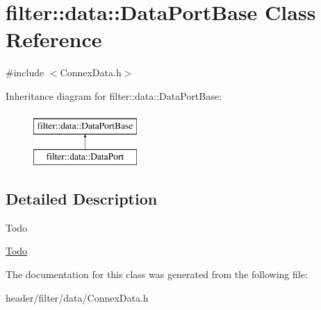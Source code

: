 \hypertarget{classfilter_1_1data_1_1_data_port_base}{}\section{filter\+:\+:data\+:\+:Data\+Port\+Base Class Reference}
\label{classfilter_1_1data_1_1_data_port_base}


{\ttfamily \#include $<$Connex\+Data.\+h$>$}

Inheritance diagram for filter\+:\+:data\+:\+:Data\+Port\+Base\+:\begin{figure}[H]
\begin{center}
\leavevmode
\includegraphics[height=2.000000cm]{db/dce/classfilter_1_1data_1_1_data_port_base}
\end{center}
\end{figure}


\subsection{Detailed Description}
\begin{DoxyRefDesc}{Todo}
\item[\hyperlink{todo__todo000018}{Todo}]\end{DoxyRefDesc}


The documentation for this class was generated from the following file\+:\begin{DoxyCompactItemize}
\item 
header/filter/data/Connex\+Data.\+h\end{DoxyCompactItemize}
